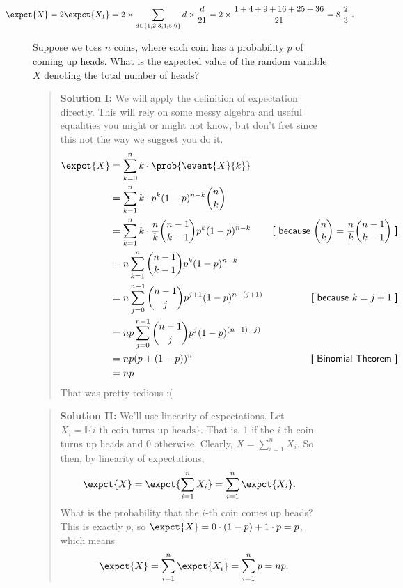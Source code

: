 {\begin{example}
\[ \expct{X} = 2 \expct{X_1} =
2 \times \sum_{d \in \{1,2,3,4,5,6\}} d \times \frac{d}{21} = 2 \times \frac{1 + 4 + 9 + 16 + 25 + 36}{21} = 8 \; \frac{2}{3}~.\]
\end{example}

\begin{figure}
\begin{example}
  Suppose we toss $n$ coins, where each coin has a probability $p$ of coming up
  heads. What is the expected value of the random variable $X$ denoting the
  total number of heads?

  \begin{quote}
    \normalfont\textbf{Solution I:} We will apply the definition of
    expectation directly.  This will rely on some messy algebra and
    useful equalities you might or might not know, but don't fret since
    this not the way we suggest you do it.
    \begin{align*}
      \expct{X} &= \sum_{k=0}^n k\cdot \prob{\event{X}{k}} \\
      &= \sum_{k=1}^n k\cdot p^k(1-p)^{n-k}\binom{n}{k} \\
      &= \sum_{k=1}^n k \cdot \frac{n}{k}\binom{n-1}{k-1} p^k(1-p)^{n-k}
      &\text{\textsf{[ because $\binom{n}{k} = \frac{n}{k}\binom{n-1}{k-1}$ ]}}
      \\
      &= n \sum_{k=1}^n \binom{n-1}{k-1} p^k(1-p)^{n-k} \\
      &= n \sum_{j=0}^{n-1} \binom{n-1}{j} p^{j+1}(1-p)^{n - (j+1)}
      &\text{\textsf{[ because $k = j + 1$ ]}}\\
      &= np \sum_{j=0}^{n-1} \binom{n-1}{j} p^{j}(1-p)^{(n-1)-j)} \\
      &= np (p + (1-p))^n       &\text{\textsf{[ Binomial Theorem ]}}\\
      &= np
    \end{align*}
    That was pretty tedious :(
  \end{quote}

  \begin{quote}
    \normalfont\textbf{Solution II:} We'll use linearity of expectations.  Let
    $X_i = \mathbb{I}\{i\text{-th coin turns up heads}\}$. That is, $1$ if
    the $i$-th coin turns up heads and $0$ otherwise.  Clearly, $X =
    \sum_{i=1}^n X_i$.  So then, by linearity of expectations,
    \begin{align*}
      \expct{X} &= \expct{\sum_{i=1}^n X_i} = \sum_{i=1}^n \expct{X_i}.
    \end{align*}
    What is the probability that the $i$-th coin comes up heads? This is exactly
    $p$, so $\expct{X} = 0\cdot (1 - p) + 1\cdot p = p$, which means
    \[
      \expct{X} = \sum_{i=1}^n \expct{X_i} = \sum_{i=1}^n p = np.
      \]
  \end{quote}
\end{example}
\end{figure}


}
